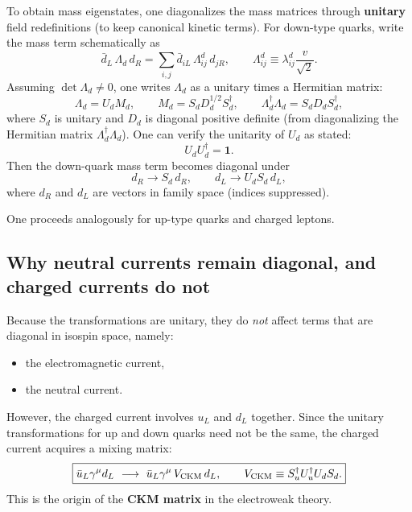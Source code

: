 To obtain mass eigenstates, one diagonalizes the mass matrices through \textbf{unitary} field redefinitions (to keep canonical kinetic terms).
For down-type quarks, write the mass term schematically as
\begin{equation}
\bar d_L\,\Lambda_d\,d_R
=\sum_{i,j}\bar d_{iL}\,\Lambda^d_{ij}\,d_{jR},
\qquad
\boxed{
\Lambda^d_{ij}\equiv \lambda^d_{ij}\frac{v}{\sqrt{2}}.
}
\end{equation}
Assuming $\det\Lambda_d\neq 0$, one writes $\Lambda_d$ as a unitary times a Hermitian matrix:
\begin{equation}
\boxed{
\Lambda_d = U_d M_d,
\qquad
M_d=S_d D_d^{1/2}S_d^\dagger,
\qquad
\Lambda_d^\dagger\Lambda_d=S_d D_d S_d^\dagger,
}
\label{eq:Lambda-decomp}
\end{equation}
where $S_d$ is unitary and $D_d$ is diagonal positive definite (from diagonalizing the Hermitian matrix $\Lambda_d^\dagger\Lambda_d$).
One can verify the unitarity of $U_d$ as stated:
\[
U_dU_d^\dagger=\mathbf 1.
\]
Then the down-quark mass term becomes diagonal under
\begin{equation}
\boxed{
d_R\to S_d\,d_R,
\qquad
d_L\to U_d S_d\,d_L,
}
\end{equation}
where $d_R$ and $d_L$ are vectors in family space (indices suppressed).

One proceeds analogously for up-type quarks and charged leptons.

\subsection{Why neutral currents remain diagonal, and charged currents do not}
Because the transformations are unitary, they do \emph{not} affect terms that are diagonal in isospin space, namely:
\begin{itemize}
  \item the electromagnetic current,
  \item the neutral current.
\end{itemize}
However, the charged current involves $u_L$ and $d_L$ together. Since the unitary transformations for up and down quarks need not be the same, the charged current acquires a mixing matrix:
\begin{equation}
\boxed{
\bar u_L\gamma^\mu d_L \ \longrightarrow\ \bar u_L\gamma^\mu\,V_{\rm CKM}\,d_L,
\qquad
V_{\rm CKM}\equiv S_u^\dagger U_u^\dagger U_d S_d.
}
\label{eq:CKM}
\end{equation}
This is the origin of the \textbf{CKM matrix} in the electroweak theory.

